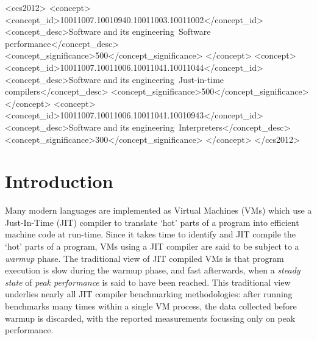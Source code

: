 \documentclass[acmsmall,screen]{acmart}
\begin{document}
\begin{CCSXML}
<ccs2012>
<concept>
<concept_id>10011007.10010940.10011003.10011002</concept_id>
<concept_desc>Software and its engineering~Software performance</concept_desc>
<concept_significance>500</concept_significance>
</concept>
<concept>
<concept_id>10011007.10011006.10011041.10011044</concept_id>
<concept_desc>Software and its engineering~Just-in-time compilers</concept_desc>
<concept_significance>500</concept_significance>
</concept>
<concept>
<concept_id>10011007.10011006.10011041.10010943</concept_id>
<concept_desc>Software and its engineering~Interpreters</concept_desc>
<concept_significance>300</concept_significance>
</concept>
</ccs2012>
\end{CCSXML}

\maketitle

\renewcommand{\shortauthors}{E.~Barrett, C.~F.~Bolz-Tereick, R.~Killick, S.~Mount, L.~Tratt}


\section{Introduction}
\label{sec:intro}

Many modern languages are implemented as Virtual Machines (VMs) which use a
Just-In-Time (JIT) compiler to translate `hot' parts of a program into efficient
machine code at run-time. Since it takes time to identify and JIT compile
the `hot' parts of a program, VMs using a JIT compiler are
said to be subject to a \emph{warmup} phase. The traditional view of
JIT compiled VMs is that program execution is slow during the warmup phase, and
fast afterwards, when a \emph{steady state} of \emph{peak performance} is said to have been reached.
This traditional view underlies nearly all JIT compiler benchmarking methodologies:
after running benchmarks many times within a single VM process, the
data collected before warmup is discarded, with the reported measurements
focussing only on peak performance.
\end{document}

